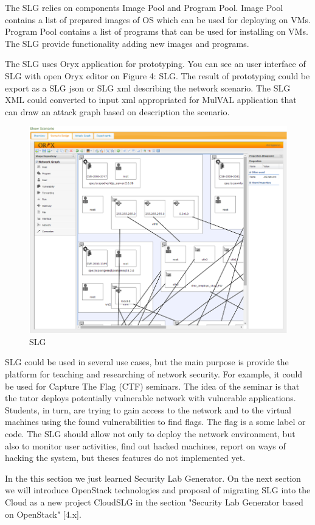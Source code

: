 The SLG relies on components Image Pool and Program Pool. Image Pool contains a list of prepared images of OS which can be used for deploying on VMs. Program Pool contains a list of programs that can be used for installing on VMs. The SLG provide functionality adding new images and programs.  

The SLG uses Oryx application for prototyping. You can see an user interface of SLG with open Oryx editor on Figure 4: SLG. The result of prototyping could be export as a SLG json or SLG xml describing the network scenario. The SLG XML could converted to input xml appropriated for MulVAL application that can draw an attack graph based on description the scenario. 

\begin{figure}[ht!]
\centering
\includegraphics[width=\textwidth]{slg.png}
\caption{SLG}
\label{overflow}
\end{figure}



  SLG could be used in several use cases, but the main purpose is provide the platform for teaching and researching of network security. For example, it could be used for Capture The Flag (CTF) seminars. The idea of the seminar is that the tutor deploys potentially vulnerable network with vulnerable applications. Students, in turn, are trying to gain access to the network and to the virtual machines using the found vulnerabilities to find flags. The flag is a some label or code. The SLG should allow not only to deploy the network environment, but also to monitor user activities, find out hacked machines, report on ways of hacking the system, but theses features do not implemented yet. 
  
  
In the this section we just learned Security Lab Generator. On the next section we will introduce OpenStack technologies and proposal of migrating SLG into the Cloud as a new project CloudSLG in the section "Security Lab Generator based on OpenStack" [4.x]. 


 






% 